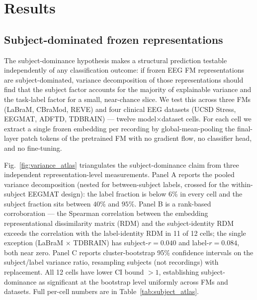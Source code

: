 \section{Results}
\label{sec:results}

\subsection{Subject-dominated frozen representations}
\label{sec:results_atlas}

The subject-dominance hypothesis makes a structural prediction
testable independently of any classification outcome: if frozen EEG
FM representations are subject-dominated, variance decomposition of
those representations should find that the subject factor accounts
for the majority of explainable variance and the task-label factor
for a small, near-chance slice. We test this across three FMs
(LaBraM, CBraMod, REVE) and four clinical EEG datasets
(UCSD Stress, EEGMAT, ADFTD, TDBRAIN) --- twelve model$\times$dataset
cells. For each cell we extract a single frozen embedding per
recording by global-mean-pooling the final-layer patch tokens of the
pretrained FM with no gradient flow, no classifier head, and no
fine-tuning.

Fig.~\ref{fig:variance_atlas} triangulates the subject-dominance
claim from three independent representation-level measurements.
Panel A reports the pooled variance decomposition (nested for
between-subject labels, crossed for the within-subject EEGMAT
design): the label fraction is below $6$\% in every cell and the
subject fraction sits between $40$\% and $95$\%. Panel B is a
rank-based corroboration --- the Spearman correlation between the
embedding representational dissimilarity matrix (RDM) and the
subject-identity RDM exceeds the correlation with the
label-identity RDM in 11 of 12 cells; the single exception
(LaBraM $\times$ TDBRAIN) has subject-$r = 0.040$ and label-$r =
0.084$, both near zero. Panel C reports cluster-bootstrap 95\%
confidence intervals on the subject/label variance ratio,
resampling subjects (not recordings) with replacement. All 12 cells
have lower CI bound $> 1$, establishing subject-dominance as
significant at the bootstrap level uniformly across FMs and
datasets. Full per-cell numbers are in Table~\ref{tab:subject_atlas}.


